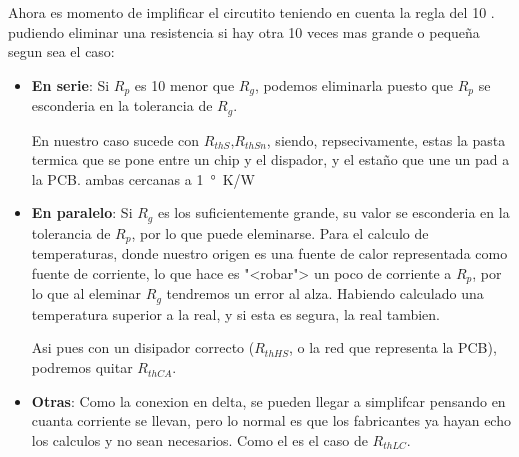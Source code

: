 Ahora es momento de implificar el circutito teniendo en cuenta la regla del 10
. pudiendo eliminar una resistencia
si hay otra 10 veces mas grande o pequeña segun sea el caso:
\begin{itemize}
    \item \textbf{En serie}: Si $R_p$ es 10 menor que $R_g$, podemos eliminarla puesto que 
    $R_p$ se esconderia en la tolerancia de $R_g$.

    En nuestro caso sucede con $R_{thS}$,$R_{thSn}$, siendo, repsecivamente, estas la pasta
    termica que se pone entre un chip y el dispador, y el estaño que une un pad a la PCB.
    ambas cercanas a \SI{1}{\degree\kelvin/\watt}
    \item \textbf{En paralelo}: Si $R_g$ es los suficientemente grande, su valor se esconderia
    en la tolerancia de $R_p$, por lo que puede eleminarse. Para el calculo de temperaturas, donde nuestro
    origen es una fuente de calor representada como fuente de corriente, lo que hace es "<robar">
    un poco de corriente a $R_p$, por lo que al eleminar $R_g$ tendremos un error al alza. 
    Habiendo calculado una temperatura superior a la real, y si esta es segura, la real tambien.
    
    Asi pues con un disipador correcto ($R_{thHS}$, o la red que representa la PCB), podremos quitar
    $R_{thCA}$.
    \item \textbf{Otras}: Como la conexion en delta, se pueden llegar a simplifcar
    pensando en cuanta corriente se llevan, pero lo normal es que los fabricantes ya
    hayan echo los calculos y no sean necesarios. Como el es el caso de $R_{thLC}$.    
\end{itemize}